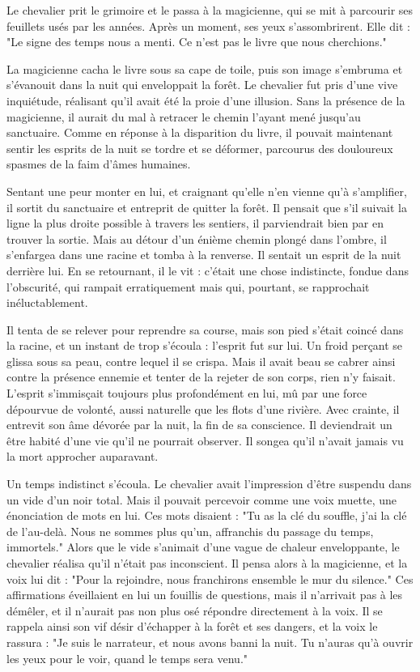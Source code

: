 \documentclass[a4paper,11pt, openany]{book}
\begin{document}
Le chevalier prit le grimoire et le passa à la magicienne, qui se mit à parcourir ses feuillets usés par les années. Après un moment, ses yeux s'assombrirent. Elle dit :
"Le signe des temps nous a menti. Ce n'est pas le livre que nous cherchions."

La magicienne cacha le livre sous sa cape de toile, puis son image s'embruma et s'évanouit dans la nuit qui enveloppait la forêt.
Le chevalier fut pris d'une vive inquiétude, réalisant qu'il avait été la proie d'une illusion. 
Sans la présence de la magicienne, il aurait du mal à retracer le chemin l'ayant mené jusqu'au sanctuaire. 
Comme en réponse à la disparition du livre, il pouvait maintenant sentir les esprits de la nuit se tordre et se déformer, 
parcourus des douloureux spasmes de la faim d'âmes humaines. 

Sentant une peur monter en lui, et craignant qu'elle n'en vienne qu'à s'amplifier, 
il sortit du sanctuaire et entreprit de quitter la forêt.
Il pensait que s'il suivait la ligne la plus droite possible à travers les sentiers, il parviendrait bien par en trouver la sortie.
Mais au détour d'un énième chemin plongé dans l'ombre, il s'enfargea dans une racine et tomba à la renverse.
Il sentait un esprit de la nuit derrière lui. En se retournant, il le vit : c'était une chose indistincte, fondue dans l'obscurité, 
qui rampait erratiquement mais qui, pourtant, se rapprochait inéluctablement. 

Il tenta de se relever pour reprendre sa course, mais son pied s'était coincé dans la racine, et un instant de trop s'écoula : l'esprit fut sur lui.
Un froid perçant se glissa sous sa peau, contre lequel il se crispa. Mais il avait beau se cabrer ainsi contre la présence ennemie et tenter de la rejeter de son corps, rien n'y faisait.
L'esprit s'immisçait toujours plus profondément en lui, mû par une force dépourvue de volonté, aussi naturelle que les flots d'une rivière.
Avec crainte, il entrevit son âme dévorée par la nuit, la fin de sa conscience. Il deviendrait un être habité d'une vie qu'il ne pourrait observer.
Il songea qu'il n'avait jamais vu la mort approcher auparavant.

Un temps indistinct s'écoula. Le chevalier avait l'impression d'être suspendu dans un vide d'un noir total. Mais il pouvait percevoir comme une voix muette, une énonciation de mots en lui.
Ces mots disaient : "Tu as la clé du souffle, j'ai la clé de l'au-delà. Nous ne sommes plus qu'un, affranchis du passage du temps, immortels."
Alors que le vide s'animait d'une vague de chaleur enveloppante, le chevalier réalisa qu'il n'était pas inconscient. 
Il pensa alors à la magicienne, et la voix lui dit : "Pour la rejoindre, nous franchirons ensemble le mur du silence."
Ces affirmations éveillaient en lui un fouillis de questions, mais il n'arrivait pas à les démêler, et il n'aurait pas non plus osé répondre directement à la voix.
Il se rappela ainsi son vif désir d'échapper à la forêt et ses dangers, et la voix le rassura : "Je suis le narrateur, et nous avons banni la nuit. Tu n'auras qu'à ouvrir les yeux pour le voir, quand le temps sera venu."
\end{document}
